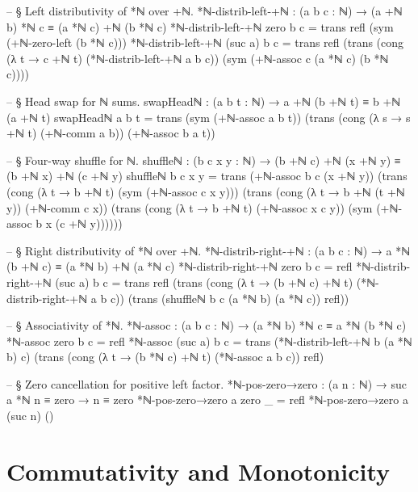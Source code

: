 \documentclass[11pt,a4paper]{book}
\begin{document}
\begin{code}
-- § Left distributivity of *ℕ over +ℕ.
*ℕ-distrib-left-+ℕ : (a b c : ℕ) → (a +ℕ b) *ℕ c ≡ (a *ℕ c) +ℕ (b *ℕ c)
*ℕ-distrib-left-+ℕ zero b c =
  trans
    refl
    (sym (+ℕ-zero-left (b *ℕ c)))
*ℕ-distrib-left-+ℕ (suc a) b c =
  trans
    refl
    (trans
      (cong (λ t → c +ℕ t) (*ℕ-distrib-left-+ℕ a b c))
      (sym (+ℕ-assoc c (a *ℕ c) (b *ℕ c))))

-- § Head swap for ℕ sums.
swapHeadℕ : (a b t : ℕ) → a +ℕ (b +ℕ t) ≡ b +ℕ (a +ℕ t)
swapHeadℕ a b t =
  trans
    (sym (+ℕ-assoc a b t))
    (trans
      (cong (λ s → s +ℕ t) (+ℕ-comm a b))
      (+ℕ-assoc b a t))

-- § Four-way shuffle for ℕ.
shuffleℕ : (b c x y : ℕ) → (b +ℕ c) +ℕ (x +ℕ y) ≡ (b +ℕ x) +ℕ (c +ℕ y)
shuffleℕ b c x y =
  trans
    (+ℕ-assoc b c (x +ℕ y))
    (trans
      (cong (λ t → b +ℕ t) (sym (+ℕ-assoc c x y)))
      (trans
        (cong (λ t → b +ℕ (t +ℕ y)) (+ℕ-comm c x))
        (trans
          (cong (λ t → b +ℕ t) (+ℕ-assoc x c y))
          (sym (+ℕ-assoc b x (c +ℕ y))))))

-- § Right distributivity of *ℕ over +ℕ.
*ℕ-distrib-right-+ℕ : (a b c : ℕ) → a *ℕ (b +ℕ c) ≡ (a *ℕ b) +ℕ (a *ℕ c)
*ℕ-distrib-right-+ℕ zero b c = refl
*ℕ-distrib-right-+ℕ (suc a) b c =
  trans
    refl
    (trans
      (cong (λ t → (b +ℕ c) +ℕ t) (*ℕ-distrib-right-+ℕ a b c))
      (trans
        (shuffleℕ b c (a *ℕ b) (a *ℕ c))
        refl))

-- § Associativity of *ℕ.
*ℕ-assoc : (a b c : ℕ) → (a *ℕ b) *ℕ c ≡ a *ℕ (b *ℕ c)
*ℕ-assoc zero b c = refl
*ℕ-assoc (suc a) b c =
  trans
    (*ℕ-distrib-left-+ℕ b (a *ℕ b) c)
    (trans
      (cong (λ t → (b *ℕ c) +ℕ t) (*ℕ-assoc a b c))
      refl)

-- § Zero cancellation for positive left factor.
*ℕ-pos-zero→zero : (a n : ℕ) → suc a *ℕ n ≡ zero → n ≡ zero
*ℕ-pos-zero→zero a zero _ = refl
*ℕ-pos-zero→zero a (suc n) ()
\end{code}

\section{Commutativity and Monotonicity}
\end{document}
